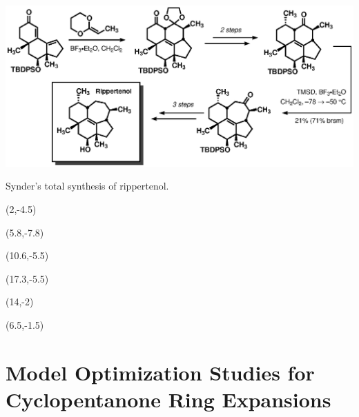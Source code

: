 \begin{Scheme}[t]
  \centering \includegraphics[scale=0.8]{chp_singlecarbon/images/snyder}
  \caption{Synder's total synthesis of rippertenol.}
\begin{textblock}{1}(2,-4.5)  \end{textblock}	
\begin{textblock}{1}(5.8,-7.8)  \end{textblock}	
\begin{textblock}{1}(10.6,-5.5)  \end{textblock}	
\begin{textblock}{1}(17.3,-5.5)  \end{textblock}	
\begin{textblock}{1}(14,-2)  \end{textblock}	
\begin{textblock}{1}(6.5,-1.5)  \end{textblock}	
  \label{sch:snyder}
\end{Scheme}


\clearpage
\section{Model Optimization Studies for Cyclopentanone Ring Expansions}
\label{sec:modeloptimization}

